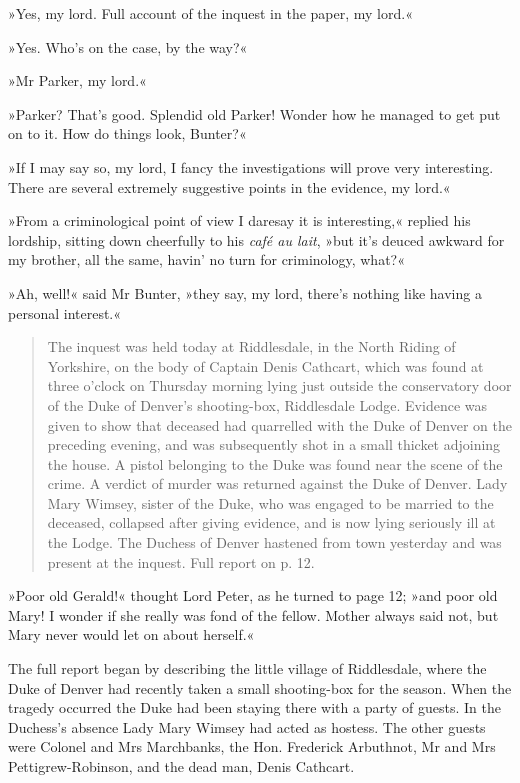 »Yes, my lord. Full account of the inquest in the paper, my lord.«

»Yes. Who's on the case, by the way?«

»Mr Parker, my lord.«

»Parker? That's good. Splendid old Parker! Wonder how he managed to get put on to it. How do things look, Bunter?«

»If I may say so, my lord, I fancy the investigations will prove very interesting. There are several extremely suggestive points in the evidence, my lord.«

»From a criminological point of view I daresay it is interesting,« replied his lordship, sitting down cheerfully to his \foreignlanguage{french}{\textit{café au lait}}, »but it's deuced awkward for my brother, all the same, havin' no turn for criminology, what?«

»Ah, well!« said Mr Bunter, »they say, my lord, there's nothing like having a personal interest.«

\begin{quote}
\indent The inquest was held today at Riddlesdale, in the North Riding of Yorkshire, on the body of Captain Denis Cathcart, which was found at three o'clock on Thursday morning lying just outside the conservatory door of the Duke of Denver's shooting-box, Riddlesdale Lodge. Evidence was given to show that deceased had quarrelled with the Duke of Denver on the preceding evening, and was subsequently shot in a small thicket adjoining the house. A pistol belonging to the Duke was found near the scene of the crime. A verdict of murder was returned against the Duke of Denver. Lady Mary Wimsey, sister of the Duke, who was engaged to be married to the deceased, collapsed after giving evidence, and is now lying seriously ill at the Lodge. The Duchess of Denver hastened from town yesterday and was present at the inquest. Full report on p. 12.  
\end{quote}

»Poor old Gerald!« thought Lord Peter, as he turned to page 12; »and poor old Mary! I wonder if she really was fond of the fellow. Mother always said not, but Mary never would let on about herself.«

The full report began by describing the little village of Riddlesdale, where the Duke of Denver had recently taken a small shooting-box for the season. When the tragedy occurred the Duke had been staying there with a party of guests. In the Duchess's absence Lady Mary Wimsey had acted as hostess. The other guests were Colonel and Mrs Marchbanks, the Hon. Frederick Arbuthnot, Mr and Mrs Pettigrew-Robinson, and the dead man, Denis Cathcart.

